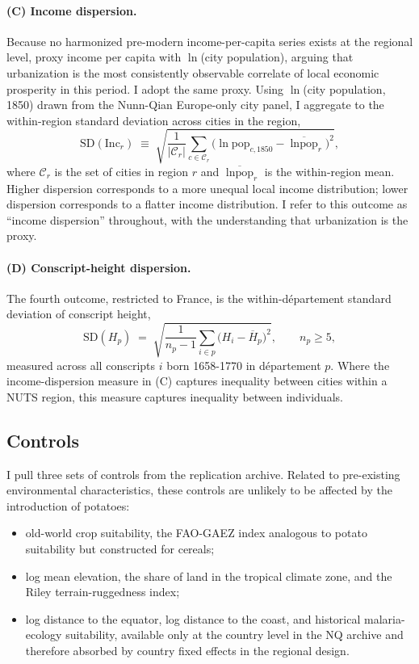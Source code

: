 \documentclass[11pt]{article}
\begin{document}
\paragraph{(C) Income dispersion.} Because no harmonized pre-modern income-per-capita series exists at the regional level, \citet{NunnQian2011} proxy income per capita with $\ln$(city population), arguing that urbanization is the most consistently observable correlate of local economic prosperity in this period. I adopt the same proxy. Using $\ln$(city population, 1850) drawn from the Nunn-Qian Europe-only city panel, I aggregate to the within-region standard deviation across cities in the region,
\begin{equation}\label{eq:incsd}
\mathrm{SD}(\mathrm{Inc}_r) \;\equiv\; \sqrt{\frac{1}{|\mathcal{C}_r|}\sum_{c \in \mathcal{C}_r}\bigl(\ln\text{pop}_{c,1850} - \overline{\ln\text{pop}}_r\bigr)^{\!2}},
\end{equation}
where $\mathcal{C}_r$ is the set of cities in region $r$ and $\overline{\ln\text{pop}}_r$ is the within-region mean. Higher dispersion corresponds to a more unequal local income distribution; lower dispersion corresponds to a flatter income distribution. I refer to this outcome as ``income dispersion'' throughout, with the understanding that urbanization is the proxy.

\paragraph{(D) Conscript-height dispersion.} The fourth outcome, restricted to France, is the within-département standard deviation of conscript height,
\begin{equation}\label{eq:heightsd}
\mathrm{SD}(H_p) \;=\; \sqrt{\frac{1}{n_p - 1}\sum_{i \in p}\!\bigl(H_i - \overline{H}_p\bigr)^{\!2}}, \qquad n_p \geq 5,
\end{equation}
measured across all conscripts $i$ born 1658-1770 in département $p$. Where the income-dispersion measure in (C) captures inequality between cities within a NUTS region, this measure captures inequality between individuals.

\subsection{Controls}
I pull three sets of controls from the \citet{NunnQian2011} replication archive. Related to pre-existing environmental characteristics, these controls are unlikely to be affected by the introduction of potatoes:
\begin{itemize}
\item old-world crop suitability, the FAO-GAEZ index analogous to potato suitability but constructed for cereals;
\item log mean elevation, the share of land in the tropical climate zone, and the Riley terrain-ruggedness index;
\item log distance to the equator, log distance to the coast, and historical malaria-ecology suitability, available only at the country level in the NQ archive and therefore absorbed by country fixed effects in the regional design.
\end{itemize}
\end{document}
